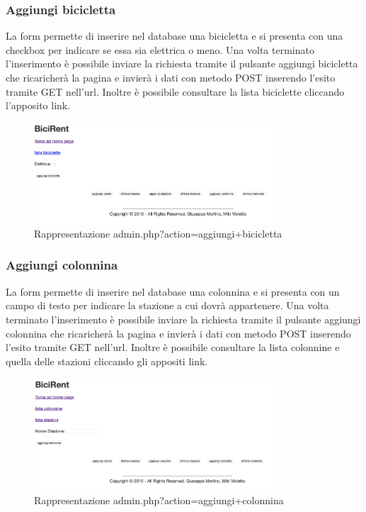 \documentclass[a4paper,twoside]{article}
\begin{document}
\subsubsection{Aggiungi bicicletta}
La form permette di inserire nel database una bicicletta e si presenta con una checkbox per indicare se essa sia elettrica o meno. Una volta terminato l'inserimento è possibile inviare la richiesta tramite il pulsante aggiungi bicicletta che ricaricherà la pagina e invierà i dati con metodo POST inserendo l'esito tramite GET nell'url. Inoltre è possibile consultare la lista biciclette cliccando l'apposito link.
\begin{figure}[H]
	\centering
	\includegraphics[width=0.8\textwidth]{Screenshot11}
	\caption{Rappresentazione admin.php?action=aggiungi+bicicletta}
\end{figure}
\subsubsection{Aggiungi colonnina}
La form permette di inserire nel database una colonnina e si presenta con un campo di testo per indicare la stazione a cui dovrà appartenere. Una volta terminato l'inserimento è possibile inviare la richiesta tramite il pulsante aggiungi colonnina che ricaricherà la pagina e invierà i dati con metodo POST inserendo l'esito tramite GET nell'url. Inoltre è possibile consultare la lista colonnine e quella delle stazioni cliccando gli appositi link.
\begin{figure}[H]
	\centering
	\includegraphics[width=0.8\textwidth]{Screenshot12}
	\caption{Rappresentazione admin.php?action=aggiungi+colonnina}
\end{figure}
\end{document}
